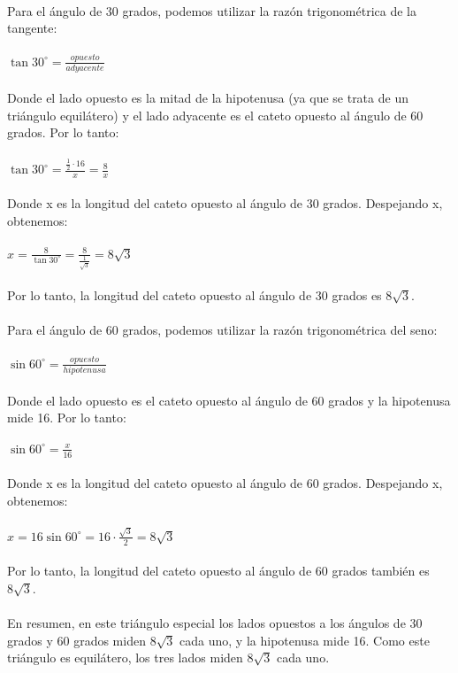 \documentclass{article}
\begin{document}
\\
Para el ángulo de 30 grados, podemos utilizar la razón trigonométrica de la tangente:\\
\\
$\tan 30^\circ = \frac{opuesto}{adyacente}$\\
\\
Donde el lado opuesto es la mitad de la hipotenusa (ya que se trata de un triángulo equilátero) y el lado adyacente es el cateto opuesto al ángulo de 60 grados. Por lo tanto:\\
\\
$\tan 30^\circ = \frac{\frac{1}{2} \cdot 16}{x} = \frac{8}{x}$\\
\\
Donde x es la longitud del cateto opuesto al ángulo de 30 grados. Despejando x, obtenemos:\\
\\
$x = \frac{8}{\tan 30^\circ} = \frac{8}{\frac{1}{\sqrt{3}}} = 8\sqrt{3}$\\
\\
Por lo tanto, la longitud del cateto opuesto al ángulo de 30 grados es $8\sqrt{3}$.\\
\\
Para el ángulo de 60 grados, podemos utilizar la razón trigonométrica del seno:\\
\\
$\sin 60^\circ = \frac{opuesto}{hipotenusa}$\\
\\
Donde el lado opuesto es el cateto opuesto al ángulo de 60 grados y la hipotenusa mide 16. Por lo tanto:\\
\\
$\sin 60^\circ = \frac{x}{16}$\\
\\
Donde x es la longitud del cateto opuesto al ángulo de 60 grados. Despejando x, obtenemos:\\
\\
$x = 16\sin 60^\circ = 16\cdot \frac{\sqrt{3}}{2} = 8\sqrt{3}$\\
\\
Por lo tanto, la longitud del cateto opuesto al ángulo de 60 grados también es $8\sqrt{3}$.\\
\\
En resumen, en este triángulo especial los lados opuestos a los ángulos de 30 grados y 60 grados miden $8\sqrt{3}$ cada uno, y la hipotenusa mide 16. Como este triángulo es equilátero, los tres lados miden $8\sqrt{3}$ cada uno.\\
\end{document}
